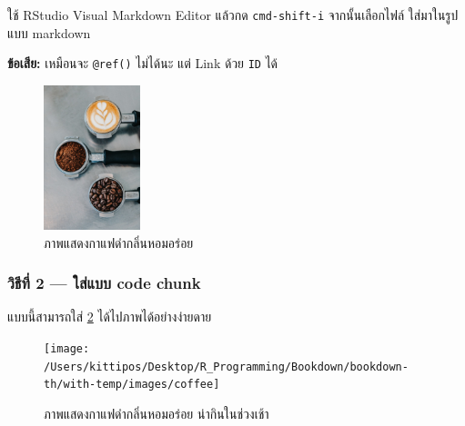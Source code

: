\documentclass[
]{article}
\begin{document}
ใช้ RStudio Visual Markdown Editor แล้วกด \texttt{cmd-shift-i} จากนั้นเลือกไฟล์ ใส่มาในรูปแบบ markdown

\textbf{ข้อเสีย:} เหมือนจะ \texttt{@ref()} ไม่ได้นะ แต่ Link ด้วย \texttt{ID} ได้

\begin{figure}
\hypertarget{coffee}{%
\centering
\includegraphics[width=0.25\textwidth,height=\textheight]{images/coffee.jpg}
\caption{ภาพแสดงกาแฟดำกลิ่นหอมอร่อย}\label{coffee}
}
\end{figure}

\hypertarget{image-method2}{%
\subsubsection{วิธีที่ 2 --- ใส่แบบ code chunk}\label{image-method2}}

แบบนี้สามารถใส่ \texttt{\ref{fig:img-coffee}} ได้ไปภาพได้อย่างง่ายดาย



\begin{figure}

{\centering \texttt{[image: /Users/kittipos/Desktop/R\_Programming/Bookdown/bookdown-th/with-temp/images/coffee]} 

}

\caption{ภาพแสดงกาแฟดำกลิ่นหอมอร่อย น่ากินในช่วงเช้า}\label{fig:img-coffee}
\end{figure}
\end{document}
